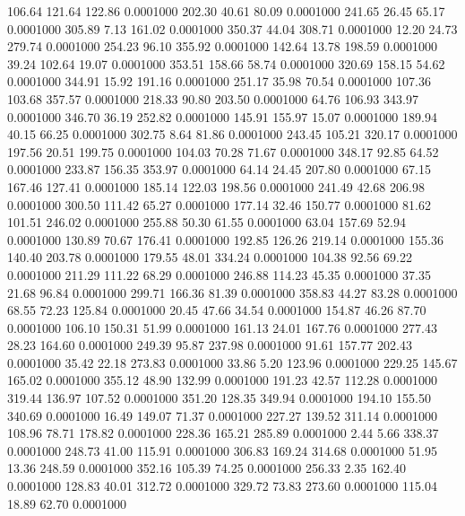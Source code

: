  106.64  121.64  122.86   0.0001000
 202.30   40.61   80.09   0.0001000
 241.65   26.45   65.17   0.0001000
 305.89    7.13  161.02   0.0001000
 350.37   44.04  308.71   0.0001000
  12.20   24.73  279.74   0.0001000
 254.23   96.10  355.92   0.0001000
 142.64   13.78  198.59   0.0001000
  39.24  102.64   19.07   0.0001000
 353.51  158.66   58.74   0.0001000
 320.69  158.15   54.62   0.0001000
 344.91   15.92  191.16   0.0001000
 251.17   35.98   70.54   0.0001000
 107.36  103.68  357.57   0.0001000
 218.33   90.80  203.50   0.0001000
  64.76  106.93  343.97   0.0001000
 346.70   36.19  252.82   0.0001000
 145.91  155.97   15.07   0.0001000
 189.94   40.15   66.25   0.0001000
 302.75    8.64   81.86   0.0001000
 243.45  105.21  320.17   0.0001000
 197.56   20.51  199.75   0.0001000
 104.03   70.28   71.67   0.0001000
 348.17   92.85   64.52   0.0001000
 233.87  156.35  353.97   0.0001000
  64.14   24.45  207.80   0.0001000
  67.15  167.46  127.41   0.0001000
 185.14  122.03  198.56   0.0001000
 241.49   42.68  206.98   0.0001000
 300.50  111.42   65.27   0.0001000
 177.14   32.46  150.77   0.0001000
  81.62  101.51  246.02   0.0001000
 255.88   50.30   61.55   0.0001000
  63.04  157.69   52.94   0.0001000
 130.89   70.67  176.41   0.0001000
 192.85  126.26  219.14   0.0001000
 155.36  140.40  203.78   0.0001000
 179.55   48.01  334.24   0.0001000
 104.38   92.56   69.22   0.0001000
 211.29  111.22   68.29   0.0001000
 246.88  114.23   45.35   0.0001000
  37.35   21.68   96.84   0.0001000
 299.71  166.36   81.39   0.0001000
 358.83   44.27   83.28   0.0001000
  68.55   72.23  125.84   0.0001000
  20.45   47.66   34.54   0.0001000
 154.87   46.26   87.70   0.0001000
 106.10  150.31   51.99   0.0001000
 161.13   24.01  167.76   0.0001000
 277.43   28.23  164.60   0.0001000
 249.39   95.87  237.98   0.0001000
  91.61  157.77  202.43   0.0001000
  35.42   22.18  273.83   0.0001000
  33.86    5.20  123.96   0.0001000
 229.25  145.67  165.02   0.0001000
 355.12   48.90  132.99   0.0001000
 191.23   42.57  112.28   0.0001000
 319.44  136.97  107.52   0.0001000
 351.20  128.35  349.94   0.0001000
 194.10  155.50  340.69   0.0001000
  16.49  149.07   71.37   0.0001000
 227.27  139.52  311.14   0.0001000
 108.96   78.71  178.82   0.0001000
 228.36  165.21  285.89   0.0001000
   2.44    5.66  338.37   0.0001000
 248.73   41.00  115.91   0.0001000
 306.83  169.24  314.68   0.0001000
  51.95   13.36  248.59   0.0001000
 352.16  105.39   74.25   0.0001000
 256.33    2.35  162.40   0.0001000
 128.83   40.01  312.72   0.0001000
 329.72   73.83  273.60   0.0001000
 115.04   18.89   62.70   0.0001000
